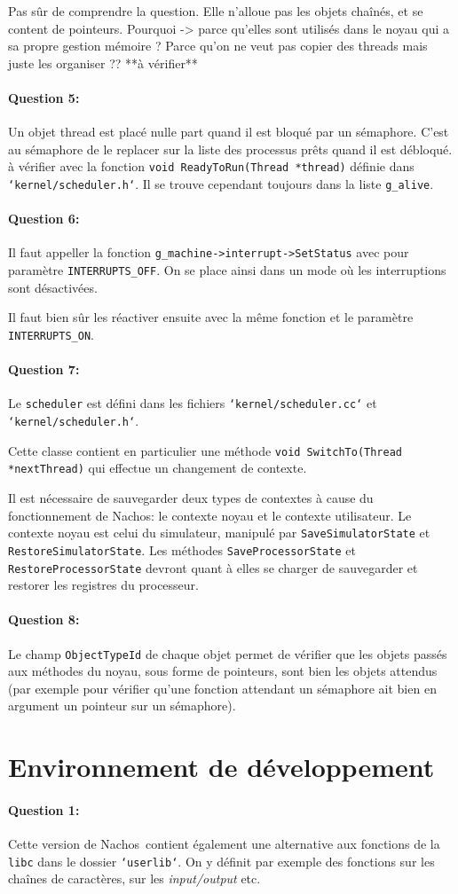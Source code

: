 \documentclass[11pt]{article}
\def\question#1{\paragraph{Question #1:}}
\def\pathfile#1{\texttt{`#1`}}
\def\var#1{\texttt{#1}}
\def\func#1{\texttt{#1}}
\def\obj#1{\texttt{#1}}
\def\comment#1{\color{red}#1\color{black}}
\def\nachos{Nachos}
\begin{document}
\comment{Pas sûr de comprendre la question. Elle n'alloue pas les objets chaînés, et se content de pointeurs. Pourquoi -> parce qu'elles sont utilisés dans le noyau qui a sa propre gestion mémoire ? Parce qu'on ne veut pas copier des threads mais juste les organiser ?? **à vérifier**  }

\question{5} Un objet thread est placé \comment{nulle part} quand il est bloqué par un sémaphore. C'est au sémaphore de le replacer sur la liste des processus prêts quand il est débloqué. \comment{à vérifier} avec la fonction \func{void ReadyToRun(Thread *thread)} définie dans \pathfile{kernel/scheduler.h}. Il se trouve cependant toujours dans la liste \var{g\_alive}.

\question{6} Il faut appeller la fonction \func{g\_machine->interrupt->SetStatus} avec pour paramètre \var{INTERRUPTS\_OFF}. On se place ainsi dans un mode où les interruptions sont désactivées.  

Il faut bien sûr les réactiver ensuite avec la même fonction et le paramètre \var{INTERRUPTS\_ON}.

\question{7}  Le \obj{scheduler} est défini dans les fichiers \pathfile{kernel/scheduler.cc} et \pathfile{kernel/scheduler.h}.

Cette classe contient en particulier une méthode \func{void SwitchTo(Thread *nextThread)} qui effectue un changement de contexte.  

Il est nécessaire de sauvegarder deux types de contextes à cause du fonctionnement de \nachos: le contexte noyau et le contexte utilisateur.  
Le contexte noyau est celui du simulateur, manipulé par \func{SaveSimulatorState} et \func{RestoreSimulatorState}.  
Les méthodes \func{SaveProcessorState} et \func{RestoreProcessorState} devront quant à elles se charger de sauvegarder et restorer les registres du processeur.

\question{8}  Le champ \var{ObjectTypeId} de chaque objet permet de vérifier que les objets passés aux méthodes du noyau, sous forme de pointeurs, sont bien les objets attendus (par exemple pour vérifier qu'une fonction attendant un sémaphore ait bien en argument un pointeur sur un sémaphore).

\section*{Environnement de développement}
\question{1} 
Cette version de \nachos\ contient également une alternative aux fonctions de la \texttt{libc} dans le dossier \pathfile{userlib}. On y définit par exemple des fonctions sur les chaînes de caractères, sur les \textit{input/output} etc.
\end{document}
